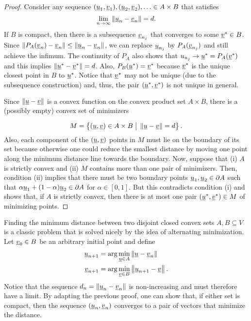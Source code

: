 \begin{proof}
Consider any sequence $(\underline u_{1},\underline v_{1}),(\underline u_{2},\underline v_{2}),\ldots\in A\times B$ that satisfies
\[
\lim_{n\rightarrow\infty}\left\Vert \underline u_{n}-\underline v_{n}\right\Vert =d.
\]
If $B$ is compact, then there is a subsequence $\underline v_{n_{j}}$ that converges to some $\underline v^{*}\in B$.
Since $\| P_A (\underline{v}_n)-\underline v_{n} \| \leq \|\underline u_{n}-\underline v_{n}\| $, we can replace $\underline u_{n_{j}}$ by $P_A (\underline{v}_{n_j})$ and still achieve the infimum.
The continuity of $P_A$ also shows that $u_{n_{j}} \to \underline{u}^* = P_A (\underline{v}^*)$ and this implies $\| \underline{u}^* - \underline{v}^* \| = d$.
Also, $P_B (\underline{u}^*) = \underline{v}^*$ because $\underline{v}^*$ is the unique closest point in $B$ to $\underline{u}^*$.
Notice that $\underline v^{*}$ may not be unique (due to the subsequence construction) and, thus, the pair $(\underline{u}^*,\underline{v}^*)$ is not unique in general.

Since $\left\Vert \underline u-\underline v\right\Vert $ is a convex function on the convex product set $A\times B$, there is a (possibly empty) convex set of minimizers

\[
M=\left\{ (\underline u,\underline v)\in A\times B\;\big|\;\left\Vert \underline u-\underline v\right\Vert =d\right\} .
\]
Also, each component of the $(\underline{u},\underline{v})$ points in $M$ must lie on the boundary of its set because otherwise one could reduce the smallest distance by moving one point along the minimum distance line towards the boundary. Now, suppose that (i) $A$ is strictly convex and (ii) $M$ contains more than one pair of minimizers. Then, condition (ii) implies that there must be two boundary points $\underline u_{1},\underline u_{2}\in\partial A$ such that $\alpha\underline u_{1}+(1-\alpha)\underline u_{2}\in\partial A$ for $\alpha\in[0,1]$. But this contradicts condition (i) and shows that, if $A$ is strictly convex, then there is at most one pair $(\underline u^{*},\underline v^{*})\in M$ of minimizing points.
\end{proof}

\begin{remark}
Finding the minimum distance between two disjoint closed convex sets $A,B\subseteq V$ is a classic problem that is solved nicely by the idea of alternating minimization. Let $\underline v_{0}\in B$ be an arbitrary initial point and define
\begin{align*}
\underline u_{n+1} & =\arg\min_{\underline u\in A}\left\Vert \underline u-\underline v_{n}\right\Vert \\
\underline v_{n+1} & =\arg\min_{\underline v\in B}\left\Vert \underline u_{n+1}-\underline v\right\Vert .
\end{align*}
Notice that the sequence $d_{n}=\left\Vert \underline u_{n}-\underline v_{n}\right\Vert $ is non-increasing and must therefore have a limit.
By adapting the previous proof, one can show that, if either set is compact, then the sequence $(\underline u_{n},\underline v_{n})$ converges to a pair of vectors that minimize the distance. %
\end{remark}

